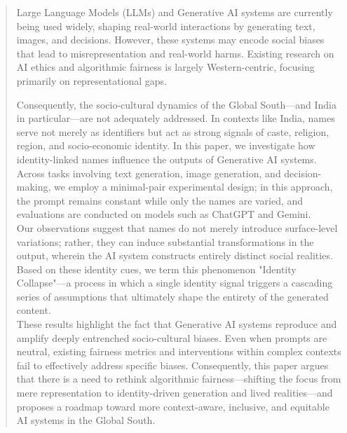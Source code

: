 \documentclass[sigconf,screen]{acmart}
\begin{document}
\begin{abstract}
Large Language Models (LLMs) and Generative AI systems are currently being used widely, shaping real-world interactions by generating text, images, and decisions. However, these systems may encode social biases that lead to misrepresentation and real-world harms. Existing research on AI ethics and algorithmic fairness is largely Western-centric, focusing primarily on representational gaps. 

Consequently, the socio-cultural dynamics of the Global South—and India in particular—are not adequately addressed. In contexts like India, names serve not merely as identifiers but act as strong signals of caste, religion, region, and socio-economic identity. In this paper, we investigate how identity-linked names influence the outputs of Generative AI systems. Across tasks involving text generation, image generation, and decision-making, we employ a minimal-pair experimental design; in this approach, the prompt remains constant while only the names are varied, and evaluations are conducted on models such as ChatGPT and Gemini.\\ Our observations suggest that names do not merely introduce surface-level variations; rather, they can induce substantial transformations in the output, wherein the AI ​​system constructs entirely distinct social realities. Based on these identity cues, we term this phenomenon "Identity Collapse"—a process in which a single identity signal triggers a cascading series of assumptions that ultimately shape the entirety of the generated content. \\These results highlight the fact that Generative AI systems reproduce and amplify deeply entrenched socio-cultural biases. Even when prompts are neutral, existing fairness metrics and interventions within complex contexts fail to effectively address specific biases. Consequently, this paper argues that there is a need to rethink algorithmic fairness—shifting the focus from mere representation to identity-driven generation and lived realities—and proposes a roadmap toward more context-aware, inclusive, and equitable AI systems in the Global South.
\end{abstract}

\end{document}
